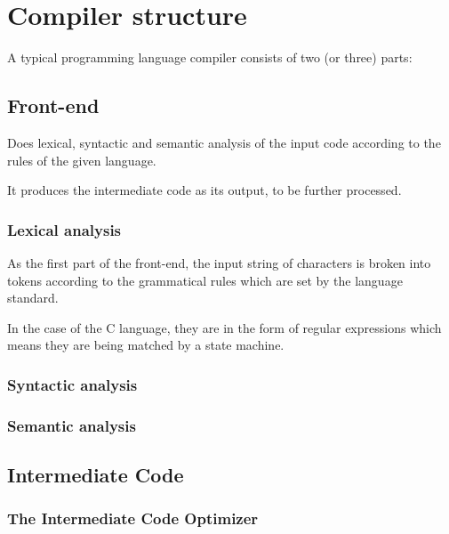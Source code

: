     \section{Compiler structure}

    A typical programming language compiler consists of two (or three) parts:


        \subsection{Front-end}

            Does lexical, syntactic and semantic analysis of the input code according to the rules of the given language.

            It produces the intermediate code as its output, to be further processed.
            

            \subsubsection{Lexical analysis}

                As the first part of the front-end, the input string of characters is broken into tokens according to the grammatical rules which are set by the language standard.

                In the case of the C language, they are in the form of regular expressions which means they are being matched by a state machine.

            \subsubsection{Syntactic analysis}


            \subsubsection{Semantic analysis}


        \subsection{Intermediate Code}

            \subsubsection{The Intermediate Code Optimizer}

